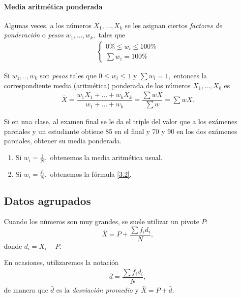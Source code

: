 \paragraph{Media aritmética ponderada}
Algunas veces, a los números $X_{1},...,X_{k}$ se les asignan ciertos \emph{factores de ponderación} o \emph{pesos} $w_{1},...,w_{k},$ tales que \begin{align}
\begin{cases}
0\% \leq w_{i}\leq 100\% \\
 \sum w_{i} = 100\%
\end{cases}
\end{align}


 \begin{defn}
  Si $w_{1},..,w_{k}$ son \emph{pesos} tales que $0\leq w_{i}\leq 1$ y $\sum w_{i}=1,$ entonces la correspondiente media (aritmética) ponderada de los números $X_{1},...,X_{k}$ es
  \begin{align}
\bar{X}= \dfrac{w_{1}X_{1}+...+w_{k}X_{k}}{w_{1}+...+w_{k}}=\dfrac{\sum wX}{\sum w}=\sum wX.
\end{align}
 \end{defn}



\begin{ejemplo}
 Si en una clase, al examen final se le da el triple del valor que a los exámenes parciales y un estudiante obtiene 85 en el final y 70 y 90 en los dos exámenes parciales, obtener su media ponderada.
\end{ejemplo}



\begin{enumerate}
 \item Si $w_{i}=\frac{1}{N},$ obtenemos la media aritmética usual. 
 \item Si $w_{i}=\frac{f_{i}}{N},$ obtenemos la fórmula \eqref{3.2}.
\end{enumerate}



 \subsection{Datos agrupados}
 
 Cuando los números son muy grandes, se suele utilizar un pivote $P:$ 
 $$
 \bar{X}=P+\dfrac{\sum f_{i}d_{i}}{N},
 $$
 donde $d_{i}=X_{i}-P.$

 En ocasiones, utilizaremos la notación
 \begin{align}
 \bar{d}=\dfrac{\sum f_{i}d_{i}}{N},
 \end{align}
 de manera que $\bar{d}$ es la \emph{desviación promedio} y $\bar{X}=P+\bar{d}.$

